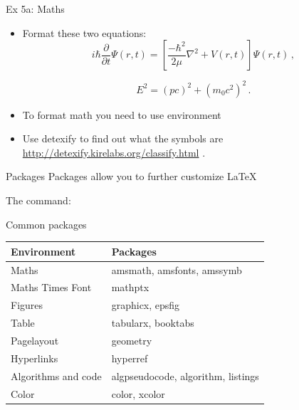 \documentclass[10pt,times]{beamer}
\begin{document}
\begin{frame}{Ex 5a: Maths}

\begin{itemize}
\item Format these two equations:
\begin{equation*}
i \hbar \frac{\partial}{\partial t} \Psi(r,t) = 
\left[\frac{-\hbar^2}{2\mu}\nabla^2+V(r,t)\right]\Psi(r,t) \,,
\end{equation*}

\begin{equation*}
E^2 = (pc)^2 + (m_0 c^2)^2 \,.
\end{equation*}

\begin{center}
\end{center}
\item To format math you need to use  environment
\item Use detexify to find out what the symbols are 
\href{http://detexify.kirelabs.org/classify.html}{http://detexify.kirelabs.org/classify.html}
.
\end{itemize}

\end{frame}

\begin{frame}{Packages}
Packages allow you to further customize \LaTeX
\begin{block}{The command:}
\end{block}

\begin{block}{Common packages}
\begin{tabularx}{0.95\textwidth}{lX}
\toprule
Environment & Packages \\ \midrule
Maths & amsmath, amsfonts, amssymb \\ 
Maths Times Font & {mathptx} \\
Figures & graphicx, epsfig \\
Table & tabularx, booktabs \\
Pagelayout & geometry \\
Hyperlinks & hyperref \\
Algorithms and code & algpseudocode, algorithm, listings \\
Color & color, xcolor \\
\bottomrule
\end{tabularx}
\end{block}
\end{frame}
\end{document}
